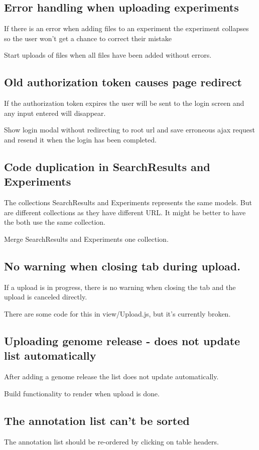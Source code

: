 \subsection{Error handling when uploading experiments}
If there is an error when adding files to an experiment the experiment collapses so the user won't get a chance to correct their mistake 

Start uploads of files when all files have been added without errors. 

\subsection{Old authorization token causes page redirect}
If the authorization token expires the user will be sent to the login screen and any input entered will disappear.

Show login modal without redirecting to root url and save erroneous ajax request and resend it when the login has been completed.

\subsection{Code duplication in SearchResults and Experiments}
The collections SearchResults and Experiments represents the same models. But are different collections as they have different URL. It might be better to have the both use the same collection.

Merge SearchResults and Experiments one collection.

\subsection{No warning when closing tab during upload.}
If a upload is in progress, there is no warning when closing the tab and the upload is canceled directly.

There are some code for this in view/Upload.js, but it's currently broken.

\subsection{Uploading genome release - does not update list automatically}
After adding a genome release the list does not update automatically.

Build functionality to render when upload is done. 

\subsection{The annotation list can't be sorted}
The annotation list should be re-ordered by clicking on table headers.

